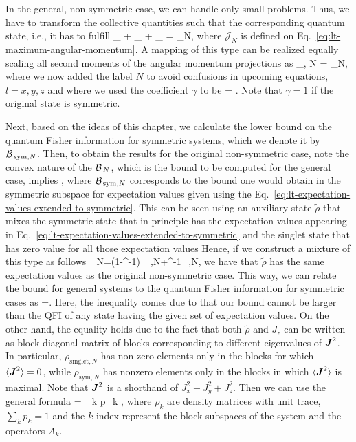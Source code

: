 In the general, non-symmetric case, we can handle only small problems.
Thus, we have to transform the collective quantities such that the corresponding quantum state, i.e., it has to fulfill
\be
  _{} + _{} + _{} = _N,
\ee
where $\mathcal{J}_{N}$ is defined on Eq.~\eqref{eq:lt-maximum-angular-momentum}.
A mapping of this type can be realized equally scaling all second moments of the angular momentum projections as
\be
  \label{eq:lt-expectation-values-extended-to-symmetric}
  _{, N} = \gamma {}_N,
\ee
where we now added the label $N$ to avoid confusions in upcoming equations, $l=x,y,z$ and where we used the coefficient $\gamma$ to be
\be
  \label{eq:lt-value-of-gamma}
  \gamma = .
\ee
Note that $\gamma=1$ if the original state is symmetric.

Next, based on the ideas of this chapter, we calculate the lower bound on the quantum Fisher information for symmetric systems, which we denote it by $\mathcal{B}_{\, \text{sym},N }$.
Then, to obtain the results for the original non-symmetric case, note the convex nature of the $\mathcal{B}_{\, N }$, which is the bound to be computed for the general case, implies
\be
  \leqslant {},
\ee
where $\mathcal{B}_{\, \text{sym},N }$ corresponds to the bound one would obtain in the symmetric subspace for expectation values given using the Eq.~\eqref{eq:lt-expectation-values-extended-to-symmetric}.
This can be seen using an auxiliary state $\tilde{\rho}$ that mixes the symmetric state that in principle has the expectation values appearing in Eq.~\eqref{eq:lt-expectation-values-extended-to-symmetric} and the singlet state that has zero value for all those expectation values
Hence, if we construct a mixture of this type as follows
\be
  \tilde{\rho}_N=(1-\gamma^{-1}) \rho_{,N}+\gamma^{-1}\rho_{,N},
\ee
we have that $\tilde{\rho}$ has the same expectation values as the original non-symmetric case.
This way, we can relate the bound for general systems to the quantum Fisher information for symmetric cases as
\be
  \label{eq:lt-radial-linearity-dicke-bound}
  \leqslant {}=.
\ee
Here, the inequality comes due to that our bound cannot be larger than the QFI of any state having the given set of expectation values.
On the other hand, the equality holds due to the fact that both $\tilde{\rho}$ and $J_z$ can be written as block-diagonal matrix of blocks corresponding to different eigenvalues of $\boldsymbol{J}^2$.
In particular, $\rho_{\text{singlet},N}$ has non-zero elements only in the blocks for which $\langle{\ensuremath{\boldsymbol{J}}^2}\rangle=0$, while $\rho_{\text{sym},N}$ has nonzero elements only in the blocks in which $\langle{\ensuremath{\boldsymbol{J}}^2}\rangle$ is maximal.
Note that $\boldsymbol{J}^2$ is a shorthand of $J_x^2+J_y^2+J_z^2$.
Then we can use the general formula \cite{Toth2014}
\be
  = \sum_k p_k ,
\ee
where $\rho_k$ are density matrices with unit trace, $\sum_k p_k=1$ and the $k$ index represent the block subspaces of the system and the operators $A_k$.

